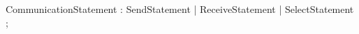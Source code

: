 %
%
%
\begin{rail}
CommunicationStatement : SendStatement | ReceiveStatement
               | SelectStatement ;
\end{rail}
